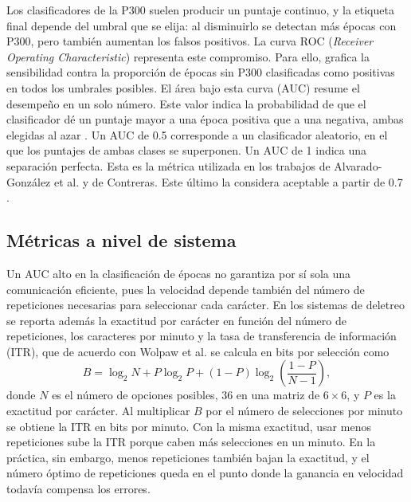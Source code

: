 Los clasificadores de la P300 suelen producir un puntaje continuo, y la etiqueta final depende del
umbral que se elija: al disminuirlo se detectan más épocas con P300, pero también aumentan los
falsos positivos. La curva ROC (\textit{Receiver Operating Characteristic}) representa este
compromiso. Para ello, grafica la sensibilidad contra la proporción de épocas sin P300
clasificadas como positivas en todos los umbrales posibles. El área bajo esta curva (AUC) resume el desempeño en un solo número. Este valor
indica la probabilidad de que el clasificador dé un puntaje mayor a una época positiva que a una
negativa, ambas elegidas al azar \cite{fawcett2006}. Un AUC de 0.5 corresponde a un clasificador
aleatorio, en el que los puntajes de ambas clases se superponen. Un AUC de 1 indica una separación
perfecta. Esta es la métrica utilizada en los trabajos de Alvarado-González et al.
y de Contreras. Este último la considera aceptable a partir de 0.7 \cite{alvarado2021,contreras2021}.

\subsection{Métricas a nivel de sistema}

Un AUC alto en la clasificación de épocas no garantiza por sí sola una comunicación eficiente,
pues la velocidad depende también del número de repeticiones necesarias para seleccionar cada
carácter. En los sistemas de deletreo se reporta además la exactitud por carácter en función
del número de repeticiones, los caracteres por minuto y la tasa de transferencia de información
(ITR), que de acuerdo con Wolpaw et al. se calcula en bits por selección como
\cite{wolpaw2000,wolpaw2002}
\begin{equation}
B = \log_2 N + P\log_2 P + (1-P)\log_2\!\left(\frac{1-P}{N-1}\right),
\label{eq:itr}
\end{equation}
donde $N$ es el número de opciones posibles, 36 en una matriz de $6\times6$, y $P$ es la exactitud
por carácter. Al multiplicar $B$ por el número de selecciones por minuto se obtiene la ITR en bits
por minuto. Con la misma exactitud, usar menos repeticiones sube la ITR porque caben más
selecciones en un minuto. En la práctica, sin embargo, menos repeticiones también bajan la
exactitud, y el número óptimo de repeticiones queda en el punto donde la ganancia en velocidad
todavía compensa los errores.
